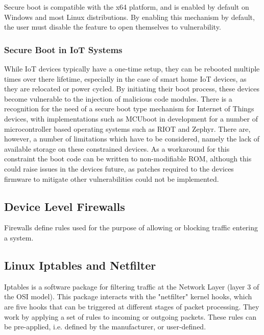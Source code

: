 Secure boot is compatible with the x64 platform, and is enabled by default on
Windows and most Linux distributions\cite{hoffman_2017}. By enabling this
mechanism by default, the user must disable the feature to open themselves to
vulnerability.

\subsubsection{Secure Boot in IoT Systems}

While IoT devices typically have a one-time setup, they can be rebooted multiple
times over there lifetime, especially in the case of smart home IoT devices, as
they are relocated or power cycled. By initiating their boot process, these
devices become vulnerable to the injection of malicious code modules. There is a
recognition for the need of a secure boot type mechanism for Internet of Things
devices, with implementations such as MCUboot in development for a number of
microcontroller based operating systems such as RIOT and
Zephyr\cite{juullabs-oss}. There are, however, a number of limitations which
have to be considered, namely the lack of available storage on these constrained
devices. As a workaround for this constraint the boot code can be written to
non-modifiable ROM, although this could raise issues in the devices future, as
patches required to the devices firmware to mitigate other vulnerabilities could
not be implemented\cite{iotSecurityFoundation}.

\subsection{Device Level Firewalls}

Firewalls define rules used for the purpose of allowing or blocking traffic
entering a system.

\subsection{Linux Iptables and Netfilter}

Iptables is a software package for filtering traffic at the Network Layer
(layer 3 of the OSI model). This package interacts with the "netfilter" kernel
hooks, which are five hooks that can be triggered at different stages of packet
processing. They work by applying a set of rules to incoming or outgoing packets.
These rules can be pre-applied, i.e. defined by the manufacturer, or user-defined.

